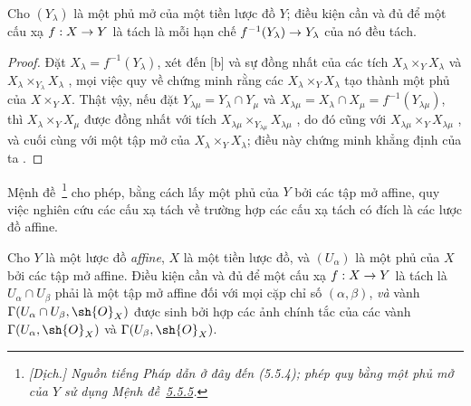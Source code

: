 \documentclass[oneside]{amsart}
\makeatletter
\newcommand{\ega@arrow}[2]{\mathchoice{#1}{#2}{#2}{#2}}
\renewcommand{\to}{\ega@arrow{\longrightarrow}{\rightarrow}}
\newcommand{\oldpage}[2][]{{\marginnote{\normalfont\textbf{#1}~|~#2}}\ignorespaces}
\let\EGAOriginalLabel\label
\renewcommand{\label}[1]{\phantomsection\EGAOriginalLabel{#1}}
\makeatother
\begin{document}
\oldpage[I]{138}

\begin{proposition}[5.5.5]
\label{I.5.5.5}
Cho $(Y_\lambda)$ là một phủ mở của một tiền lược đồ $Y$; điều kiện cần và đủ
để một cấu xạ $f:X\to Y$ là tách là mỗi hạn chế
$f^{-1}(Y_\lambda)\to Y_\lambda$ của nó đều tách.
\end{proposition}

\begin{proof}
Đặt $X_\lambda=f^{-1}(Y_\lambda)$, xét đến [b] và sự đồng nhất
của các tích $X_\lambda\times_Y X_\lambda$ và
$X_\lambda\times_{Y_\lambda}X_\lambda$ , mọi việc quy về chứng
minh rằng các $X_\lambda\times_Y X_\lambda$ tạo thành một phủ của
$X\times_Y X$.
Thật vậy, nếu đặt $Y_{\lambda\mu}=Y_\lambda\cap Y_\mu$ và
$X_{\lambda\mu}=X_\lambda\cap X_\mu=f^{-1}(Y_{\lambda\mu})$, thì
$X_\lambda\times_Y X_\mu$ được đồng nhất với tích
$X_{\lambda\mu}\times_{Y_{\lambda\mu}}X_{\lambda\mu}$
, do đó cũng với
$X_{\lambda\mu}\times_Y X_{\lambda\mu}$ , và cuối cùng với
một tập mở của $X_\lambda\times_Y X_\lambda$; điều này chứng minh khẳng định
của ta .
\end{proof}

Mệnh đề~\footnote{\emph{[Dịch.] Nguồn tiếng Pháp dẫn ở đây
đến (5.5.4); phép quy bằng một phủ mở của $Y$ sử dụng
Mệnh đề~\hyperref[I.5.5.5]{5.5.5}.}} cho phép, bằng cách lấy một phủ của $Y$
bởi các tập mở affine, quy việc nghiên cứu các cấu xạ tách về trường hợp các
cấu xạ tách có đích là các lược đồ affine.

\begin{proposition}[5.5.6]
\label{I.5.5.6}
Cho $Y$ là một lược đồ \emph{affine}, $X$ là một tiền lược đồ, và
$(U_\alpha)$ là một phủ của $X$ bởi các tập mở affine.
Điều kiện cần và đủ để một cấu xạ $f:X\to Y$ là tách là
$U_\alpha\cap U_\beta$ phải là một tập mở affine đối với mọi cặp chỉ số
$(\alpha,\beta)$, \emph{và} vành
$\Gamma(U_\alpha\cap U_\beta,\sh{O}_X)$ được sinh bởi hợp các ảnh chính tắc
của các vành $\Gamma(U_\alpha,\sh{O}_X)$ và
$\Gamma(U_\beta,\sh{O}_X)$.
\end{proposition}
\end{document}
